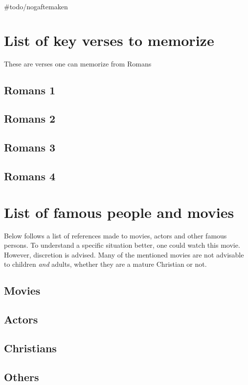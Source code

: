 \#todo/nogaftemaken

\section{List of key verses to memorize}
These are verses one can memorize from Romans 
\subsection{Romans 1}
\subsection{Romans 2}
\subsection{Romans 3}
\subsection{Romans 4}

\section{List of famous people and movies}
Below follows a list of references made to movies, actors and other famous persons. To understand a specific situation better, one could watch this movie. However, discretion is advised. Many of the mentioned movies are not advisable to children \textit{and} adults, whether they are a mature Christian or not.  

\subsection{Movies}
\subsection{Actors}
\subsection{Christians}
\subsection{Others}
 
 


